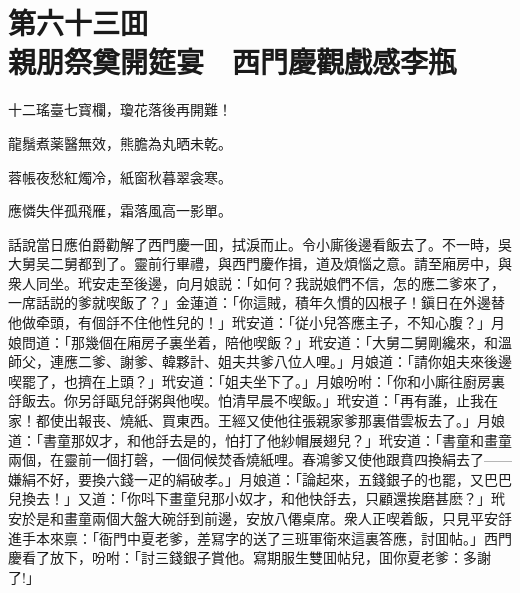 
\chapter*{第六十三囬　\\親朋祭奠開筵宴　西門慶觀戲感李瓶}


\begin{myquote}
十二瑤臺七寳欄，瓊花落後再開難！

龍鬚煮薬醫無效，熊膽為丸晒未乾。

蓉帳夜愁紅燭冷，紙窗秋暮翠衾寒。

應憐失伴孤飛雁，霜落風高一影單。
\end{myquote}

話說當日應伯爵勸解了西門慶一囬，拭淚而止。令小廝後邊看飯去了。不一時，吳大舅吴二舅都到了。靈前行畢禮，與西門慶作揖，道及煩惱之意。請至廂房中，與衆人同坐。玳安走至後邊，向月娘説：「如何？我説娘們不信，怎的應二爹來了，一席話説的爹就喫飯了？」金蓮道：「你這賊，積年久慣的囚根子！鎭日在外邊替他做牵頭，有個㧱不住他性兒的！」玳安道：「従小兒答應主子，不知心腹？」月娘問道：「那幾個在廂房子裏坐着，陪他喫飯？」玳安道：「大舅二舅剛纔來，和溫師父，連應二爹、謝爹、韓夥計、姐夫共爹八位人哩。」月娘道：「請你姐夫來後邊喫罷了，也擠在上頭？」玳安道：「姐夫坐下了。」月娘吩咐：「你和小廝往廚房裏㧱飯去。你另㧱甌兒㧱粥與他喫。怕清早晨不喫飯。」玳安道：「再有誰，止我在家！都使出報丧、燒紙、買東西。王經又使他往張親家爹那裏借雲板去了。」月娘道：「書童那奴才，和他㧱去是的，怕打了他紗帽展翅兒？」玳安道：「書童和畫童兩個，在靈前一個打磬，一個伺候焚香燒紙哩。春鴻爹又使他跟賁四換絹去了——嫌絹不好，要換六錢一疋的絹破孝。」月娘道：「論起來，五錢銀子的也罷，又巴巴兒換去！」又道：「你呌下畫童兒那小奴才，和他快㧱去，只顧還挨磨甚麽？」玳安於是和畫童兩個大盤大碗㧱到前邊，安放八僊桌席。衆人正喫着飯，只見平安㧱進手本來禀：「衙門中夏老爹，差冩字的送了三班軍衛來這裏答應，討囬帖。」西門慶看了放下，吩咐：「討三錢銀子賞他。寫期服生雙囬帖兒，囬你夏老爹：多謝了!」

